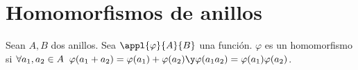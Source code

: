 \documentclass[nochap]{apuntes}
\begin{document}
\section{Homomorfismos de anillos}

\begin{defn}[Homomorfismo] Sean $A,B$ dos anillos. Sea $\appl{\varphi}{A}{B}$ una función. $\varphi$ es un homomorfismo si $\forall a_1, a_2 \in A \;\; \varphi(a_1+a_2) =\varphi(a_1) + \varphi(a_2) \y \varphi(a_1a_2) = \varphi(a_1)\varphi(a_2)$.
\end{defn}

\label{LastPage}
\end{document}
